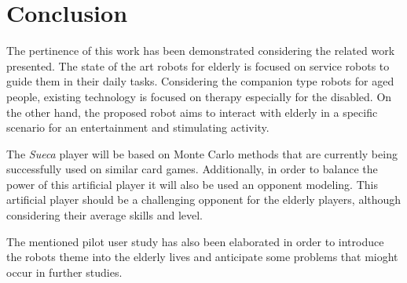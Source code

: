 \section{Conclusion} \label{sec:conclusion}

The pertinence of this work has been demonstrated considering the related work presented.
The state of the art robots for elderly is focused on service robots to guide them in their daily tasks.
Considering the companion type robots for aged people, existing technology is focused on therapy especially for the disabled.
On the other hand, the proposed robot aims to interact with elderly in a specific scenario for an entertainment and stimulating activity.

The \emph{Sueca} player will be based on Monte Carlo methods that are currently being successfully used on similar card games.
Additionally, in order to balance the power of this artificial player it will also be used an opponent modeling.
This artificial player should be a challenging opponent for the elderly players, although considering their average skills and level.

The mentioned pilot user study has also been elaborated in order to introduce the robots theme into the elderly lives and anticipate some problems that mioght occur in further studies.
